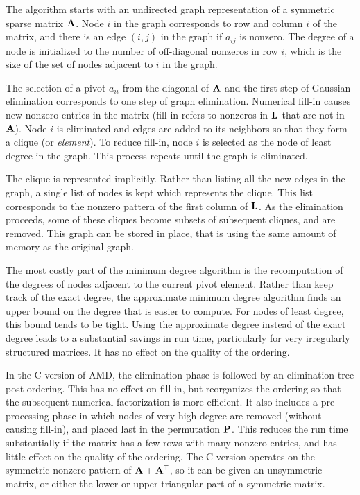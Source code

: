 \documentclass[11pt]{article}
\newcommand{\m}[1]{{\bf{#1}}}       %
\newcommand{\tr}{^{\sf T}}          %
\begin{document}
The algorithm starts with an undirected graph representation of a
symmetric sparse matrix $\m{A}$.  Node $i$ in the graph corresponds to row
and column $i$ of the matrix, and there is an edge $(i,j)$ in the graph if
$a_{ij}$ is nonzero.
The degree of a node is initialized to the number of off-diagonal nonzeros
in row $i$, which is the size of the set of nodes
adjacent to $i$ in the graph.

The selection of a pivot $a_{ii}$ from the diagonal of $\m{A}$ and the first
step of Gaussian elimination corresponds to one step of graph elimination.
Numerical fill-in causes new nonzero entries in the matrix
(fill-in refers to
nonzeros in $\m{L}$ that are not in $\m{A}$).
Node $i$ is eliminated and edges are added to its neighbors
so that they form a clique (or {\em element}).  To reduce fill-in,
node $i$ is selected as the node of least degree in the graph.
This process repeats until the graph is eliminated.

The clique is represented implicitly.  Rather than listing all the
new edges in the graph, a single list of nodes is kept which represents
the clique.  This list corresponds to the nonzero pattern of the first
column of $\m{L}$.  As the elimination proceeds, some of these cliques
become subsets of subsequent cliques, and are removed.   This graph
can be stored in place, that is
using the same amount of memory as the original graph.

The most costly part of the minimum degree algorithm is the recomputation
of the degrees of nodes adjacent to the current pivot element.
Rather than keep track of the exact degree, the approximate minimum degree
algorithm finds an upper bound on the degree that is easier to compute.
For nodes of least degree, this bound tends to be tight.  Using the
approximate degree instead of the exact degree leads to a substantial savings
in run time, particularly for very irregularly structured matrices.
It has no effect on the quality of the ordering.

In the C version of AMD, the elimination phase is followed by an
elimination tree post-ordering.  This has no effect on fill-in, but
reorganizes the ordering so that the subsequent numerical factorization is
more efficient.  It also includes a pre-processing phase in which nodes of
very high degree are removed (without causing fill-in), and placed last in the
permutation $\m{P}$.  This reduces the run time substantially if the matrix
has a few rows with many nonzero entries, and has little effect on the quality
of the ordering.
The C version operates on the
symmetric nonzero pattern of $\m{A}+\m{A}\tr$, so it can be given
an unsymmetric matrix, or either the lower or upper triangular part of
a symmetric matrix.
\end{document}
